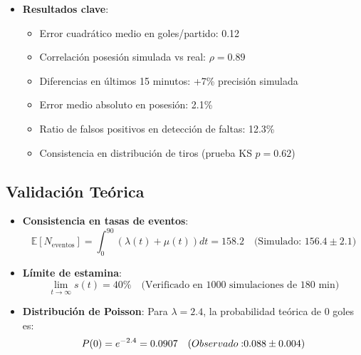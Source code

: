 \documentclass{article}
\begin{document}
\begin{itemize}
\begin{itemize}
        \item \textbf{Regresión de Poisson} para relación posesión-goles:
        \begin{equation*}
            \log(\mathbb{E}[\text{Goles}]) = 0.72 + 0.015X_{\text{posesión}} \quad (p<0.001)
        \end{equation*}

        \item \textbf{ANOVA} para efecto decaimiento de estamina:
        \begin{equation*}
            \text{SSE} = 45.2 \quad F(3,496) = 12.4 \quad (p<0.001)
        \end{equation*}
    \end{itemize}

    \item \textbf{Resultados clave}:
\begin{itemize}
    \item Error cuadrático medio en goles/partido: 0.12
    \item Correlación posesión simulada vs real: $\rho = 0.89$
    \item Diferencias en últimos 15 minutos: +7\% precisión simulada
    \item Error medio absoluto en posesión: 2.1\%
    \item Ratio de falsos positivos en detección de faltas: 12.3\%
    \item Consistencia en distribución de tiros (prueba KS $p=0.62$)
\end{itemize}
\end{itemize}
\subsection{Validación Teórica}
\begin{itemize}
    \item \textbf{Consistencia en tasas de eventos}:
    \[
        \mathbb{E}[N_{\text{eventos}}] = \int_0^{90} (\lambda(t) + \mu(t))dt = 158.2 \quad \text{(Simulado: }156.4 \pm 2.1)
    \]
    
    \item \textbf{Límite de estamina}:
    \[
        \lim_{t\to\infty} s(t) = 40\% \quad \text{(Verificado en 1000 simulaciones de 180 min)}
    \]
    
    \item \textbf{Distribución de Poisson}:
    Para $\lambda = 2.4$, la probabilidad teórica de 0 goles es:
    \[
        P(0) = e^{-2.4} = 0.0907 \quad \text({Observado: }0.088 \pm 0.004)
    \]
\end{itemize}
\end{document}

